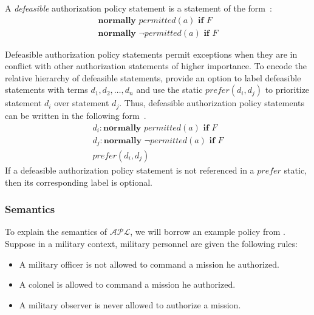 \begin{definition}
    \label{def:defeasible_authorization_statements}
    A \textit{defeasible} authorization policy statement is a statement of the form~\citep{gelfond_authorization_2008}:
    \begin{gather*}
        \textbf{normally } permitted(a) \textbf{ if } F \\
        \textbf{normally } \neg permitted(a) \textbf{ if } F
    \end{gather*}
\end{definition}

Defeasible authorization policy statements permit exceptions when they are in conflict with other authorization statements of higher importance.
To encode the relative hierarchy of defeasible statements, \citet{gelfond_authorization_2008} provide an option to label defeasible statements with terms $d_1,d_2,\dots,d_n$ and use the static $prefer\left(d_i,d_j\right)$ to prioritize statement $d_i$ over statement $d_j$.
Thus, defeasible authorization policy statements can be written in the following form~\citep{gelfond_authorization_2008}.
\begin{gather}
    d_i: \textbf{normally } permitted(a) \textbf{ if } F \\
    d_j: \textbf{normally } \neg permitted(a) \textbf{ if } F \\
    prefer(d_i, d_j)
\end{gather}
If a defeasible authorization policy statement is not referenced in a $prefer$ static, then its corresponding label is optional.

\subsubsection{Semantics}

To explain the semantics of $\mathcal{APL}$, we will borrow an example policy from \citet{gelfond_authorization_2008}.
Suppose in a military context, military personnel are given the following rules:

\begin{itemize}
    \item A military officer is not allowed to command a mission he authorized.
    \item A colonel is allowed to command a mission he authorized.
    \item A military observer is never allowed to authorize a mission.
\end{itemize}

